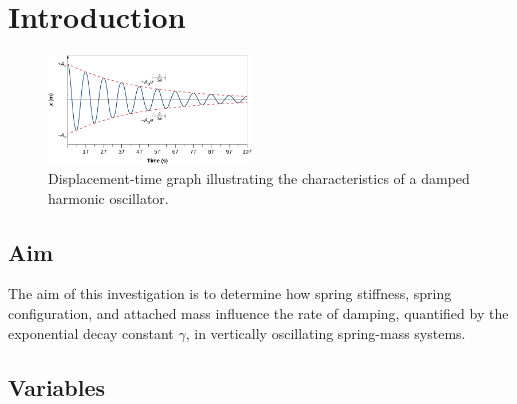 \section{Introduction}

\begin{figure}
    \centering
    \includegraphics[width=0.48\textwidth]{images/damped_shm.png}
    \caption{Displacement\hyp{}time graph illustrating the characteristics of a damped harmonic oscillator.}
\end{figure}

\subsection{Aim}
The aim of this investigation is to determine how spring stiffness, spring configuration, and attached mass influence the rate of damping, quantified by the exponential decay constant $\gamma$, in vertically oscillating spring-mass systems. \\
\lipsum[1-2]

\subsection{Variables}
\lipsum[2]

